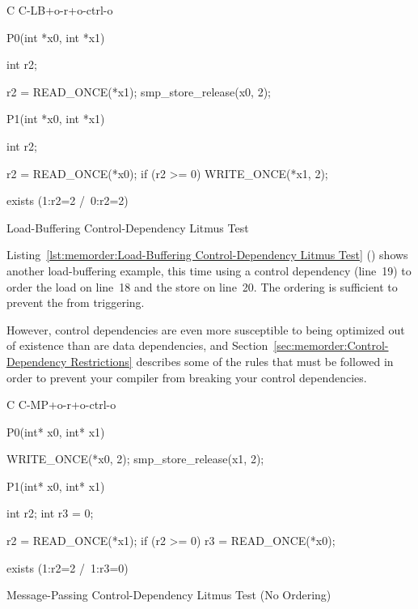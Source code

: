 \begin{listing}[tbp]
{ \scriptsize
\begin{verbbox}[\LstLineNo]
C C-LB+o-r+o-ctrl-o
{
}

P0(int *x0, int *x1)
{
  int r2;

  r2 = READ_ONCE(*x1);
  smp_store_release(x0, 2);
}


P1(int *x0, int *x1)
{
  int r2;

  r2 = READ_ONCE(*x0);
  if (r2 >= 0)
    WRITE_ONCE(*x1, 2);
}

exists (1:r2=2 /\ 0:r2=2)
\end{verbbox}
}
\centering
\theverbbox
\caption{Load-Buffering Control-Dependency Litmus Test}
\label{lst:memorder:Load-Buffering Control-Dependency Litmus Test}
\end{listing}

Listing~\ref{lst:memorder:Load-Buffering Control-Dependency Litmus Test}
()
shows another load-buffering example, this time using a control
dependency (line~19) to order the load on line~18 and the store on
line~20.
The ordering is sufficient to prevent the  from triggering.

However, control dependencies are even more susceptible to being optimized
out of existence than are data dependencies, and
Section~\ref{sec:memorder:Control-Dependency Restrictions}
describes some of the rules that must be followed in order to prevent
your compiler from breaking your control dependencies.

\begin{listing}[tbp]
{ \scriptsize
\begin{verbbox}[\LstLineNo]
C C-MP+o-r+o-ctrl-o

{
}

P0(int* x0, int* x1) {

  WRITE_ONCE(*x0, 2);
  smp_store_release(x1, 2);

}

P1(int* x0, int* x1) {
  int r2;
  int r3 = 0;

  r2 = READ_ONCE(*x1);
  if (r2 >= 0)
    r3 = READ_ONCE(*x0);

}

exists (1:r2=2 /\ 1:r3=0)
\end{verbbox}
}
\centering
\theverbbox
\caption{Message-Passing Control-Dependency Litmus Test (No Ordering)}
\label{lst:memorder:Message-Passing Control-Dependency Litmus Test (No Ordering)}
\end{listing}

